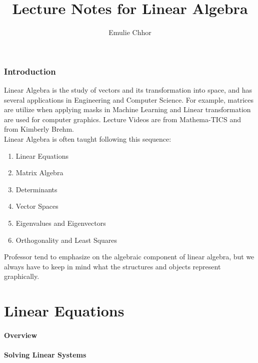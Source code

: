 \documentclass{article}
\begin{document}
\title{Lecture Notes for Linear Algebra}
\author{Emulie Chhor}
\maketitle

\section{Introduction}

Linear Algebra is the study of vectors and its transformation into space, and has
several applications in Engineering and Computer Science. For example, matrices
are utilize when applying masks in Machine Learning and Linear transformation are
used for computer graphics. Lecture Videos are from Mathema-TICS and
from Kimberly Brehm.\\


Linear Algebra is often taught following this sequence:

    \begin{enumerate}
	\item Linear Equations
	\item Matrix Algebra
	\item Determinants
	\item Vector Spaces
	\item Eigenvalues and Eigenvectors
	\item Orthogonality and Least Squares
    \end{enumerate}

Professor tend to emphasize on the algebraic component of linear algebra, but we
always have to keep in mind what the structures and objects represent graphically.

\newtheorem{definition}{Definition}[subsection]
\newtheorem{theorem}{Theorem}[subsection]
\newtheorem{corollary}{Corollary}[subsection]
\newtheorem{lemma}[theorem]{Lemma}
\newtheorem*{remark}{Remark}

\part{Linear Equations}

\subsection{Overview}

\subsection{Solving Linear Systems}
\end{document}
